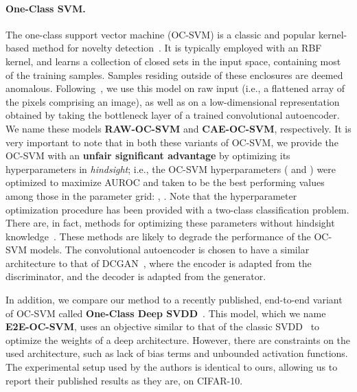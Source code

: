 \documentclass{article}
\begin{document}
	\paragraph{One-Class SVM.} The one-class support vector machine (OC-SVM) is a classic and popular kernel-based method for novelty detection~\cite{scholkopf2000support, tax2004support}. It is typically employed with an RBF kernel, 
	and learns a collection of closed sets in the input space, containing most of the training samples. Samples residing outside of these enclosures are deemed anomalous. 
	Following~\cite{zhai2016deep, deecke2018anomaly}, 
	we use this model on raw input (i.e., a flattened array of the pixels comprising an image), as well as on a low-dimensional representation obtained by taking the bottleneck layer of a trained convolutional autoencoder. We name these models \textbf{RAW-OC-SVM} and \textbf{CAE-OC-SVM}, respectively.
	It is very important to note that in both these variants of OC-SVM, 
	we provide the OC-SVM with an \textbf{unfair significant advantage} by optimizing its hyperparameters in {\em hindsight}; i.e., the OC-SVM hyperparameters ( and ) were optimized to maximize AUROC and taken to be the best performing values among those in the parameter grid: , . Note that the hyperparameter optimization procedure has been 
	provided with a two-class classification problem. There are, in fact, methods for optimizing these parameters without hindsight knowledge~\cite{wang2018hyperparameter, burnaev2015model}.
	These methods are likely to degrade the performance of the OC-SVM models.
The convolutional autoencoder is chosen to have a similar architecture to that of DCGAN~\cite{radford2015unsupervised}, where the encoder is adapted from the discriminator, and the decoder is adapted from the generator. 
	
	In addition, we compare our method to a recently published, end-to-end variant of OC-SVM called \textbf{One-Class Deep SVDD}~\cite{ruff2018deep}. This model, which we name \textbf{E2E-OC-SVM}, uses an objective similar to that of the classic SVDD~\cite{tax2004support} to optimize the weights of a deep architecture. 
	However, there are constraints on the used architecture, such as lack of bias terms and unbounded activation functions. The experimental setup used by the authors is identical to ours, allowing us to report their published results as they are, on CIFAR-10.
	
\end{document}
